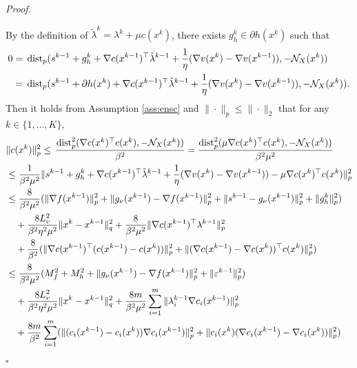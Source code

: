 \documentclass[11pt]{article}
\newenvironment{proof}[1][Proof]{%
    \par\noindent\textit{#1.}\enspace
  }{%
    \hfill\ensuremath{\square}\par
  }%
\numberwithin{equation}{section}
\newcommand{\be}{\begin{equation}}
\newcommand{\bee}{\begin{equation*}}
\newcommand{\eee}{\end{equation*}}
\begin{document}
\begin{proof}
  
    By the definition of 
    $\tilde{\lambda}^k = \lambda^k+\mu c(x^k)$, 
     there exists $g_h^k \in \partial h(x^k)$ such that
    \bee\begin{aligned}
        0 &= \, {\rm dist}_p ( s^{k-1}+g_h^k+ \nabla c ( x^{k-1} )^\top \tilde{\lambda}^{k-1}+\frac{1}{\eta}(\nabla v(x^k)-\nabla v(x^{k-1})),-\mathcal{N}_X(x^k)  )\\
        &=\, {\rm dist}_p (s^{k-1}+\partial h(x^k)+ \nabla c ( x^{k-1} )^\top \tilde{\lambda}^{k-1}+\frac{1}{\eta}(\nabla v(x^k)-\nabla v(x^{k-1})),-\mathcal{N}_X(x^k)  ).
    \end{aligned}\eee
    Then it holds from Assumption \ref{ass:ensc} and $\|\cdot\|_p\le \|\cdot\|_2 $ that for any  $k \in \{1,\ldots,K\}$,
    \begin{align}
          & \|    c ( x^k )    \|_p^2 
         \le \, \frac{{\rm dist}_p^2( \nabla c ( x^k )^\top c ( x^k )  ,  -\mathcal{N}_{X}(x^k)  ) }{\beta^2} 
         = \frac{{\rm dist}_p^2 (\mu \nabla c ( x^k )^\top c ( x^k ) , -\mathcal{N}_X(x^k)  )}{\beta^2 \mu^2 }\notag \\
        & \leq  \frac{1}{\beta^2 \mu^2 }\|s^{k-1}+g_h^k+ \nabla c ( x^{k-1} )^\top \tilde{\lambda}^{k-1}+\frac{1}{\eta}(\nabla v(x^k)-\nabla v(x^{k-1}))-\mu \nabla c ( x^k )^\top  c ( x^k ) \|_p^2  \notag \\
        & \leq   \frac{8}{\beta^2 \mu^2 }(\|\nabla f(x^{k-1})\|_p^2+\|g_\nu(x^{k-1})-\nabla f(x^{k-1})\|_p^2+\|s^{k-1}-g_\nu(x^{k-1})\|_p^2+\|g_h^k\|_p^2)\notag \\
        &\quad +\frac{8L_v ^2}{\beta^2\eta^2\mu^2}\|x^k-x^{k-1} \|_q^2+\frac{8}{\beta^2\mu^2}\|\nabla c(x^{k-1})^\top\lambda^{k-1}\|_p^2\notag \\
        &\quad +\frac{8}{\beta^2}(\|\nabla c(x^{k-1})^\top(c(x^{k-1})-c(x^k))\|_p^2+\|(\nabla c(x^{k-1})-\nabla c(x^k))^\top c(x^k)\|_p^2)\notag \\
        &\leq  \frac{8}{\beta^2 \mu^2 }(M_f^2+M_h^2+\|g_\nu(x^{k-1})-\nabla f(x^{k-1})\|_p^2+\|\varepsilon^{k-1}\|_p^2)\notag \\
        &\quad +\frac{8L_v ^2}{\beta^2\eta^2\mu^2}\|x^k-x^{k-1} \|_q^2+\frac{8m}{\beta^2 \mu^2}\sum_{i=1}^m\|\lambda_i^{k-1}\nabla c_i(x^{k-1})\|_p^2\notag \\
        &\quad +\frac{8m}{\beta^2}\sum_{i=1}^m(\|(c_i(x^{k-1})-c_i(x^k))\nabla c_i(x^{k-1})\|_p^2+\|c_i(x^k)(\nabla c_i(x^{k-1})-\nabla c_i(x^k))\|_p^2)\notag \\

\end{align}
\end{proof}
\end{document}
